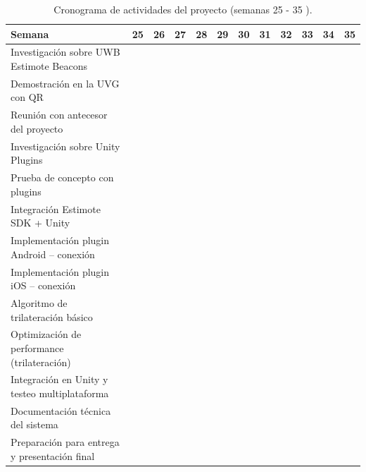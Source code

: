 \documentclass{article}
\begin{document}
\begin{landscape}
    \begin{table}[H]
        \centering
        \small
        \begin{tabular}{@{}lccccccccccc@{}}
            \toprule
            \textbf{Semana}                                               & 25 & 26 & 27 & 28 & 29 & 30 & 31 & 32 & 33 & 34 & 35 \\ 
            \midrule
            Investigación sobre UWB Estimote Beacons                      & & & & & & & & & & & \\ 
            Demostración en la UVG con QR                                 & & & & & & & & & & & \\ 
            Reunión con antecesor del proyecto                            & & & & & & & & & & & \\ 
            Investigación sobre Unity Plugins                             & & & & & & & & & & & \\ 
            Prueba de concepto con plugins                                & & & & & & & & & & & \\ 
            Integración Estimote SDK + Unity                              & & & & & & & & & & & \\ 
            Implementación plugin Android – conexión                      & & & & & & & & & & & \\ 
            Implementación plugin iOS – conexión                          & & & & & & & & & & & \\ 
            Algoritmo de trilateración básico                             & & & & & & & & & & & \\ 
            Optimización de performance (trilateración)                   & & & & & & & & & & & \\ 
            Integración en Unity y testeo multiplataforma                 & & & & & & & & & & & \\ 
            Documentación técnica del sistema                             & & & & & & & & & & & \\ 
            Preparación para entrega y presentación final                 & & & & & & & & & & & \\ 
            \bottomrule
        \end{tabular}
        \caption{Cronograma de actividades del proyecto (semanas 25 - 35 ).}
        \end{table}
\end{landscape}
\end{document}
